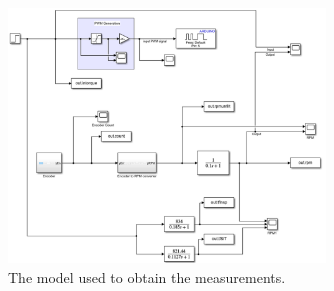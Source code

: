 \documentclass[11pt, onecolumn]{article}
\begin{document}
\begin{figure}[h!]
    \centering
    \includegraphics[width=0.75\textwidth]{q1-model.png}
    \caption{The model used to obtain the measurements.}
    \label{fig:q1-model}
\end{figure}
\end{document}
